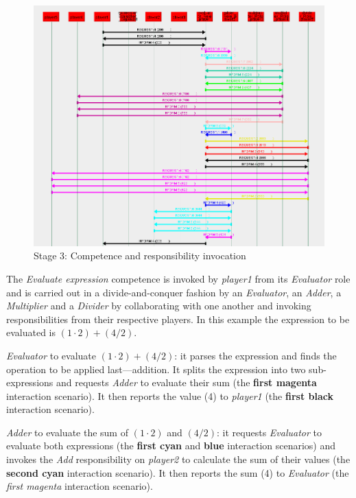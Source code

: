 \begin{figure}[H]
	\centering
	\includegraphics[width=\textwidth]{images/examples/example2-stage3.png}
	\caption{Stage 3: Competence and responsibility invocation}
	\label{figure:example2-stage3}
\end{figure}

The \textit{Evaluate expression} competence is invoked by \textit{player1} from its \textit{Evaluator} role and is carried out in a divide-and-conquer fashion by an \textit{Evaluator}, an \textit{Adder}, a \textit{Multiplier} and a \textit{Divider} by collaborating with one another and invoking responsibilities from their respective players.
In this example the expression to be evaluated is $(1\cdot2)+(4/2)$.

\textit{Evaluator} to evaluate $(1\cdot2)+(4/2)$: it parses the expression and finds the operation to be applied last---addition.
It splits the expression into two sub-expressions and requests \textit{Adder} to evaluate their sum (the \textbf{first magenta} interaction scenario).
It then reports the value (4) to \textit{player1} (the \textbf{first black} interaction scenario).

\textit{Adder} to evaluate the sum of $(1\cdot2)$ and $(4/2)$: it requests \textit{Evaluator} to evaluate both expressions (the \textbf{first cyan} and \textbf{blue} interaction scenarios) and invokes the \textit{Add} responsibility on \textit{player2} to calculate the sum of their values (the \textbf{second cyan} interaction scenario).
It then reports the sum (4) to \textit{Evaluator} (the \textit{first magenta} interaction scenario).

